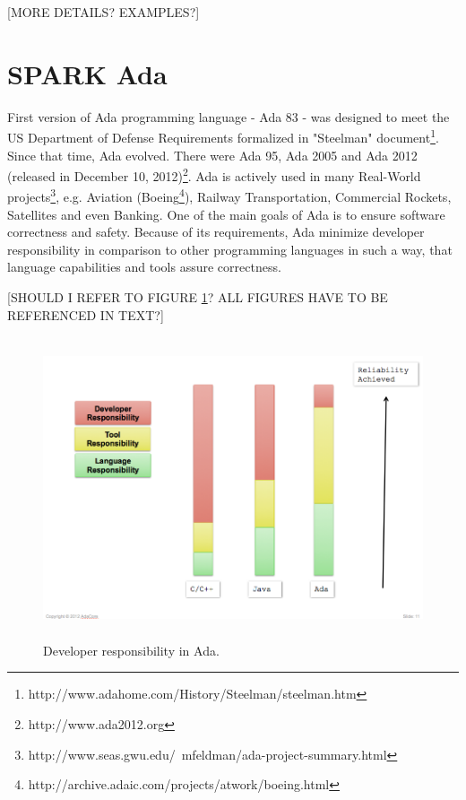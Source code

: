 [MORE DETAILS? EXAMPLES?]



\section{SPARK Ada}
\label{background:spark}


First version of Ada programming language - Ada 83 - was designed to meet the US Department of Defense Requirements formalized in "Steelman" document\footnote{http://www.adahome.com/History/Steelman/steelman.htm}. Since that time, Ada evolved. There were Ada 95, Ada 2005 and Ada 2012 (released in December 10, 2012)\footnote{http://www.ada2012.org}. Ada is actively used in many Real-World projects\footnote{http://www.seas.gwu.edu/~mfeldman/ada-project-summary.html}, e.g. Aviation (Boeing\footnote{http://archive.adaic.com/projects/atwork/boeing.html}), Railway Transportation, Commercial Rockets, Satellites and even Banking. One of the main goals of Ada is to ensure software correctness and safety. Because of its requirements, Ada minimize developer responsibility in comparison to other programming languages in such a way, that language capabilities and tools assure correctness. 

[SHOULD I REFER TO FIGURE \ref{figure:developer-responsibility-in-ada}? ALL FIGURES HAVE TO BE REFERENCED IN TEXT?]

\begin{figure}[ht]%
    \begin{center}
    	\includegraphics[height=3.5in]{figures/developer_responsibility_in_ada.png}    	
    \end{center}
    \caption{Developer responsibility in Ada\protect\footnotemark. }
    \label{figure:developer-responsibility-in-ada}
\end{figure}

